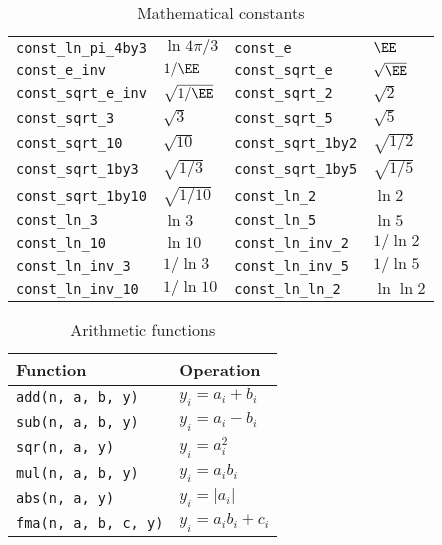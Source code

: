 \begin{table}
\begin{tabularx}{\textwidth}{p{2in}Lp{2in}L}
    \verb|const_ln_pi_4by3|   & $\ln{4\pi/3}$   &
    \verb|const_e|            & $\EE$           \\
    \verb|const_e_inv|        & $1/\EE$         &
    \verb|const_sqrt_e|       & $\sqrt{\EE}$    \\
    \verb|const_sqrt_e_inv|   & $\sqrt{1/\EE}$  &
    \verb|const_sqrt_2|       & $\sqrt{2}$      \\
    \verb|const_sqrt_3|       & $\sqrt{3}$      &
    \verb|const_sqrt_5|       & $\sqrt{5}$      \\
    \verb|const_sqrt_10|      & $\sqrt{10}$     &
    \verb|const_sqrt_1by2|    & $\sqrt{1/2}$    \\
    \verb|const_sqrt_1by3|    & $\sqrt{1/3}$    &
    \verb|const_sqrt_1by5|    & $\sqrt{1/5}$    \\
    \verb|const_sqrt_1by10|   & $\sqrt{1/10}$   &
    \verb|const_ln_2|         & $\ln{2}$        \\
    \verb|const_ln_3|         & $\ln{3}$        &
    \verb|const_ln_5|         & $\ln{5}$        \\
    \verb|const_ln_10|        & $\ln{10}$       &
    \verb|const_ln_inv_2|     & $1/\ln{2}$      \\
    \verb|const_ln_inv_3|     & $1/\ln{3}$      &
    \verb|const_ln_inv_5|     & $1/\ln{5}$      \\
    \verb|const_ln_inv_10|    & $1/\ln{10}$     &
    \verb|const_ln_ln_2|      & $\ln\ln{2}$     \\
    \bottomrule
  \end{tabularx}
  \caption{Mathematical constants}
  \label{tab:Mathematical constants}
\end{table}

\begin{table}
  \begin{tabularx}{\textwidth}{LL}
    \toprule
    Function & Operation \\
    \midrule
    \verb|add(n, a, b, y)|    & $y_i = a_i + b_i$     \\
    \verb|sub(n, a, b, y)|    & $y_i = a_i - b_i$     \\
    \verb|sqr(n, a, y)|       & $y_i = a_i^2$         \\
    \verb|mul(n, a, b, y)|    & $y_i = a_i b_i$       \\
    \verb|abs(n, a, y)|       & $y_i = |a_i|$         \\
    \verb|fma(n, a, b, c, y)| & $y_i = a_i b_i + c_i$ \\
    \bottomrule
  \end{tabularx}
  \caption{Arithmetic functions}
  \label{tab:Arithmetic functions}
\end{table}

